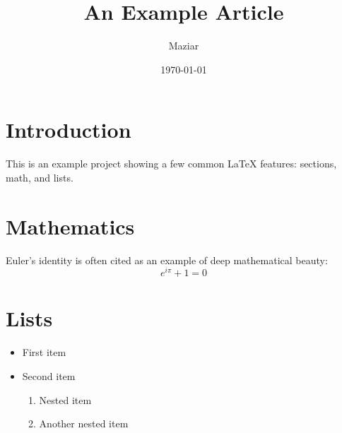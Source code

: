 \documentclass{article}
\title{An Example Article}
\author{Maziar}
\date{\today}
\begin{document}
\maketitle

\section{Introduction}
This is an example project showing a few common \LaTeX{} features: sections,
math, and lists.

\section{Mathematics}
Euler's identity is often cited as an example of deep mathematical beauty:
\[
    e^{i\pi} + 1 = 0
\]

\section{Lists}
\begin{itemize}
    \item First item
    \item Second item
    \begin{enumerate}
        \item Nested item
        \item Another nested item
    \end{enumerate}
\end{itemize}
\end{document}
